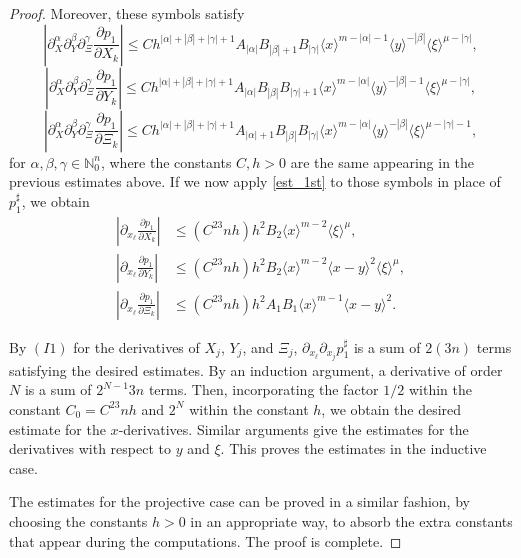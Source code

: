 \documentclass[11pt,reqno]{amsart}
\numberwithin{equation}{section}
\begin{document}
\begin{proof}
	Moreover, these symbols satisfy
	\begin{equation*}
		\left|\partial^\alpha_X\partial^\beta_Y\partial^\gamma_\Xi
		\frac{\partial p_1}{\partial X_k}\right|
		\leq Ch^{|\alpha|+|\beta|+|\gamma|+1} A_{|\alpha|}B_{|\beta|+1}B_{|\gamma|} 
		\langle x\rangle^{m-|\alpha|-1}\langle y\rangle^{-|\beta|} \langle \xi\rangle^{\mu-|\gamma|},
	\end{equation*}
	\begin{equation*}
		\left|\partial^\alpha_X\partial^\beta_Y\partial^\gamma_\Xi
		\frac{\partial p_1}{\partial Y_k}\right|
		\leq Ch^{|\alpha|+|\beta|+|\gamma|+1}A_{|\alpha|} B_{|\beta|}B_{|\gamma|+1} 
		\langle x\rangle^{m-|\alpha|}\langle y\rangle^{-|\beta|-1}\langle \xi\rangle^{\mu-|\gamma|},
	\end{equation*}
	\begin{equation*}
		\left|
		\partial^\alpha_X\partial^\beta_Y\partial^\gamma_\Xi
		\frac{\partial p_1}{\partial \Xi_k}\right|\leq Ch^{|\alpha|+|\beta|+|\gamma|+1}A_{|\alpha|+1} B_{|\beta|}B_{|\gamma|} 
		\langle x\rangle^{m-|\alpha|}\langle y\rangle^{-|\beta|}\langle \xi\rangle^{\mu-|\gamma|-1},
	\end{equation*}
	for $\alpha,\beta,\gamma\in\mathbb{N}_0^n$, where the constants $C,h>0$ are the same appearing in the previous estimates above.
	If we now apply \eqref{est_1st} to those symbols in place of $p_1^\sharp$, we obtain
	\begin{align*}
		\left| \partial_{x_\ell}\frac{\partial p_1}{\partial X_k} \right| &\leq (C^23nh)h^2  B_2 \langle x\rangle^{m-2}\langle \xi\rangle^{\mu},
	\\		
		\left| \partial_{x_\ell}\frac{\partial p_1}{\partial Y_k} \right| &\leq (C^23nh)h^2 B_2\langle x\rangle^{m-2}\langle x-y\rangle^2 \langle \xi\rangle^{\mu},
	\\
		\left| \partial_{x_\ell}\frac{\partial p_1}{\partial \Xi_k} \right| &\leq (C^23nh)h^2 A_1 B_1 \langle x\rangle^{m-1}\langle x-y\rangle^2.
	\end{align*}
	
	By $(I1)$ for the derivatives of $X_j$, $Y_j$, and $\Xi_j$, $\partial_{x_\ell}\partial_{x_j}p_1^\sharp$ is a sum of $2(3n)$ terms satisfying the desired estimates. 
	By an induction argument, a derivative of order $N$ is a sum of $2^{N-1}3n$ terms. Then, incorporating the factor $1/2$ within the constant $C_0=C^23nh$ and 
	$2^N$ within the constant $h$, we obtain the desired estimate for the $x$-derivatives. Similar arguments give the estimates for the derivatives with respect to 
	$y$ and $\xi$. This proves the estimates in the inductive case.
	
	The estimates for the projective case can be proved in a similar fashion, by choosing the constants 
	$h>0$ in an appropriate way, to absorb the extra constants that appear during the computations. The proof is complete.
\end{proof}
\end{document}
